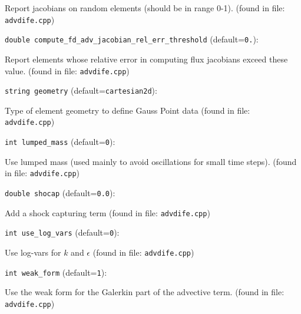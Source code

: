 Report jacobians on random elements (should be in range 0-1).
 (found in file: \verb+advdife.cpp+)
\item\verb+double compute_fd_adv_jacobian_rel_err_threshold+ {\rm(default=\verb|0.|)}:

Report elements whose relative error in computing
 flux jacobians exceed these value. 
 (found in file: \verb+advdife.cpp+)
\item\verb+string geometry+ {\rm(default=\verb|cartesian2d|)}:

Type of element geometry to define Gauss Point data
 (found in file: \verb+advdife.cpp+)
\item\verb+int lumped_mass+ {\rm(default=\verb|0|)}:

Use lumped mass (used mainly to avoid oscillations for small time steps).
 (found in file: \verb+advdife.cpp+)
\item\verb+double shocap+ {\rm(default=\verb|0.0|)}:

Add a shock capturing term
 (found in file: \verb+advdife.cpp+)
\item\verb+int use_log_vars+ {\rm(default=\verb|0|)}:

Use log-vars for $k$ and $\epsilon$
 (found in file: \verb+advdife.cpp+)
\item\verb+int weak_form+ {\rm(default=\verb|1|)}:

Use the weak form for the Galerkin part of the advective term.
 (found in file: \verb+advdife.cpp+)
